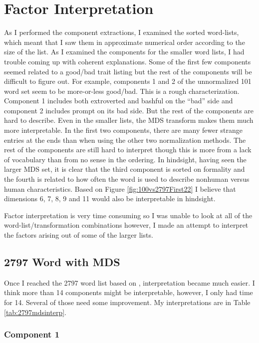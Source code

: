 \chapter{Factor Interpretation}

As I performed the component extractions, I examined the sorted word-lists, 
which meant that I saw them in approximate numerical order according to the size 
of the list. As I examined the components for the smaller word lists, I had 
trouble coming up with coherent explanations. Some of the first few components 
seemed related to a good/bad trait listing but the rest of the components will 
be difficult to figure out. For example, components 1 and 2 of the unnormalized 
101 word set seem to be more-or-less good/bad. This is a rough characterization. 
Component 1 includes both extroverted and bashful on the ``bad'' side and 
component 2 includes prompt on its bad side. But the rest of the components are 
hard to describe. Even in the smaller lists, the MDS transform makes them much 
more interpretable. In the first two components, there are many fewer strange 
entries at the ends than when using the other two normalization methods. The 
rest of the components are still hard to interpret though this is more from a 
lack of vocabulary than from no sense in the ordering. In hindsight, having seen 
the larger MDS set, it is clear that the third component is sorted on formality 
and the fourth is related to how often the word is used to describe nonhuman 
versus human characteristics. Based on Figure 
\ref{fig:100vs2797First22} I believe that dimensions 6, 7, 8, 9 and 11
would also be interpretable in hindsight.

Factor interpretation is very time consuming so I was unable to look at all of 
the word-list/transformation combinations however, I made an attempt to 
interpret the factors arising out of some of the larger lists.

\section{2797 Word with MDS}

Once I reached the 2797 word list based on \citep{Norman1967}, interpretation 
became much easier. I think more than 14 components might be interpretable, 
however, I only had time for 14. Several of those need some improvement. 
My interpretations are in Table
\ref{tab:2797mdsinterp}.

\subsection{Component 1}

